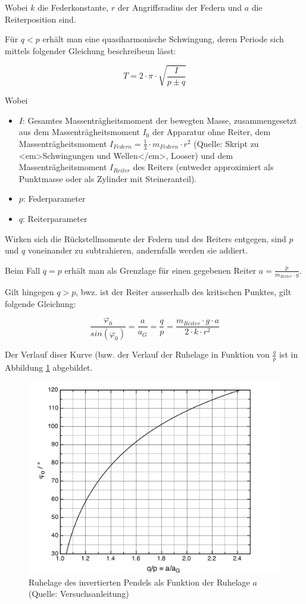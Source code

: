 Wobei $k$  die Federkonstante, $r$ der  Angriffsradius der Federn und  $a$ die
Reiterposition sind.

F\"ur $q<p$ erh\"alt man eine quasiharmonische Schwingung, deren Periode sich mittels
folgender Gleichung beschreibeun l\"asst:

\begin{equation}
    T = 2 \cdot \pi \cdot \sqrt{\frac{I}{p \pm q}}
\end{equation}

Wobei
\begin{itemize}
    \item
        $I$: Gesamtes    Massentr\"agheitsmoment     der    bewegten    Masse,
        zusammengesetzt  aus dem  Massentr\"agheitsmoment $I_0$  der Apparatur
        ohne  Reiter, dem  Massentr\"agheitsmoment  $I_{Federn} =  \frac{1}{3}
        \cdot m_{Federn}  \cdot r^2$ (Quelle:  Skript  zu <em>Schwingungen und
        Wellen</em>, Looser) und  dem Massentr\"agheitsmoment $I_{Reiter}$ des
        Reiters (entweder  approximiert als  Punktmasse oder als  Zylinder mit
        Steineranteil).
    \item
        $p$: Federparameter
    \item
        $q$: Reiterparameter
\end{itemize}

Wirken sich die  R\"uckstellmomente der Federn und des  Reiters entgegen, sind
$p$ und $q$ voneinander zu subtrahieren, andernfalls werden sie addiert.

Beim Fall $q = p$ erh\"alt man als Grenzlage f\"ur einen gegebenen Reiter $a = \frac{p}{m_{Reiter} \cdot g}$.

Gilt hingegen $q > p$, bwz. ist der Reiter ausserhalb des kritischen Punktes,
gilt folgende Gleichung:

\begin{equation}
    \frac{\varphi_0}{sin(\varphi_0)} = \frac{a}{a_G} = \frac{q}{p} = \frac{m_{Reiter} \cdot g \cdot a}{2 \cdot k \cdot r^2}
\end{equation}

Der  Verlauf diser  Kurve  (bzw.  der Verlauf  der  Ruhelage  in Funktion  von
$\frac{q}{p}$ ist in Abbildung \ref{fig:qp} abgebildet.

\begin{figure}[h!]
    \centering
    \includegraphics[width=.75\textwidth]{images/qp-plot.png}
    \caption{%
        Ruhelage des invertierten Pendels als Funktion der Ruhelage $a$ (Quelle: Versuchsanleitung)
    }
    \label{fig:qp}
\end{figure}
